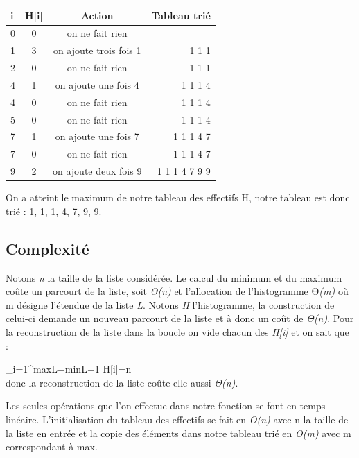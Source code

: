 \documentclass[12pt]{article}
\begin{document}
\vspace{0.5 cm}
\hspace{3.0 cm}
\begin{tabular}{|l|c|c|r|}
  \hline
  i & H[i]  & Action & Tableau trié \\
  \hline
  0 &	0 &	on ne fait rien &\\
  1 &	3 &	on ajoute trois fois 1 &	1 1 1\\
  2 &	0 &	on ne fait rien &	1 1 1\\
  4 &	1 &	on ajoute une fois 4&	1 1 1 4\\
  4 &	0& 	on ne fait rien &	1 1 1 4\\
5 &	0 &	on ne fait rien &	1 1 1 4\\
7 &	1 &	on ajoute une fois 7 &	1 1 1 4 7\\
7 &	0 &	on ne fait rien  &	1 1 1 4 7\\
9 &	2& 	on ajoute deux fois 9 &	1 1 1 4 7 9 9\\
  \hline
\end{tabular}


\vspace{1.0 cm}
On a atteint le maximum de notre tableau des effectifs H, notre tableau est donc trié : 1, 1, 1, 4, 7, 9, 9.




\newpage 
\subsection{Complexité}



\hspace{1.0 cm}  Notons \textit{n} la taille de la liste considérée. Le calcul du minimum et du maximum coûte un parcourt de la liste, soit \textit{Θ(n) }et l'allocation de l'histogramme Θ\textit{(m)} où m désigne l'étendue de la liste \textit{L}. Notons \textit{H} l'histogramme, la construction de celui-ci demande un nouveau parcourt de la liste et à donc un coût de \textit{Θ(n)}. Pour la reconstruction de la liste dans la boucle on vide chacun des \textit{H[i]} et on sait que : 


\hspace{6.0 cm}\large\sum\limits_{i=1}^{maxL−minL+1}  H[i]=n \\


\normalsize donc la reconstruction de la liste coûte elle aussi \textit{Θ(n)}.


\normalsize Les seules opérations que l'on effectue dans notre fonction se font en temps linéaire. L'initialisation du tableau des effectifs se fait en \textit{O(n)} avec n la taille de la liste en entrée et la copie des éléments dans notre tableau trié en \textit{O(m)} avec m correspondant à max.
\end{document}
